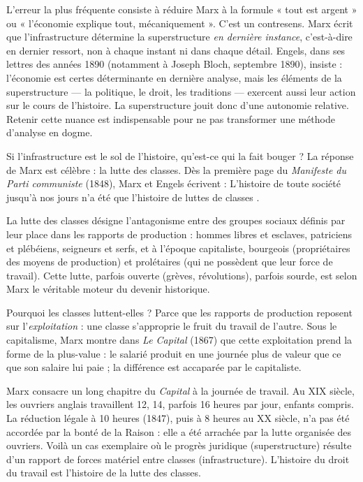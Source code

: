 \documentclass[11pt]{article}
\newcommand{\cle}[1]{{\popxbold\color{popdark}#1}}
\newcounter{popsec}
\newcounter{popsub}
\newcommand{\courssub}[1]{%
  \stepcounter{popsub}%
  \par\vspace{9pt}\noindent{\popxbold\fontsize{11.5}{13}\selectfont\color{popink}{\color{poporange}\thepopsec.\thepopsub}\hspace{6pt}#1}\par\nopagebreak\vspace{4pt}
}
\begin{document}
\begin{attention}
L'erreur la plus fréquente consiste à réduire Marx à la formule « tout est argent » ou « l'économie explique tout, mécaniquement ». C'est un contresens. Marx écrit que l'infrastructure détermine la superstructure \emph{en dernière instance}, c'est-à-dire en dernier ressort, non à chaque instant ni dans chaque détail. Engels, dans ses lettres des années 1890 (notamment à Joseph Bloch, septembre 1890), insiste : l'économie est certes déterminante en dernière analyse, mais les éléments de la superstructure — la politique, le droit, les traditions — exercent aussi leur action sur le cours de l'histoire. La superstructure jouit donc d'une \cle{autonomie relative}. Retenir cette nuance est indispensable pour ne pas transformer une méthode d'analyse en dogme.
\end{attention}

\courssub{Le moteur de l'histoire : la lutte des classes}

Si l'infrastructure est le sol de l'histoire, qu'est-ce qui la fait bouger ? La réponse de Marx est célèbre : la \cle{lutte des classes}. Dès la première page du \emph{Manifeste du Parti communiste} (1848), Marx et Engels écrivent : \guillemotleft L'histoire de toute société jusqu'à nos jours n'a été que l'histoire de luttes de classes \guillemotright.

\begin{definition}
La \cle{lutte des classes} désigne l'antagonisme entre des groupes sociaux définis par leur place dans les rapports de production : hommes libres et esclaves, patriciens et plébéiens, seigneurs et serfs, et à l'époque capitaliste, bourgeois (propriétaires des moyens de production) et prolétaires (qui ne possèdent que leur force de travail). Cette lutte, parfois ouverte (grèves, révolutions), parfois sourde, est selon Marx le véritable moteur du devenir historique.
\end{definition}

Pourquoi les classes luttent-elles ? Parce que les rapports de production reposent sur l'\emph{exploitation} : une classe s'approprie le fruit du travail de l'autre. Sous le capitalisme, Marx montre dans \emph{Le Capital} (1867) que cette exploitation prend la forme de la \cle{plus-value} : le salarié produit en une journée plus de valeur que ce que son salaire lui paie ; la différence est accaparée par le capitaliste.

\begin{exemplebox}
Marx consacre un long chapitre du \emph{Capital} à la journée de travail. Au XIX\ieme{} siècle, les ouvriers anglais travaillent 12, 14, parfois 16 heures par jour, enfants compris. La réduction légale à 10 heures (1847), puis à 8 heures au XX\ieme{} siècle, n'a pas été accordée par la bonté de la Raison : elle a été arrachée par la lutte organisée des ouvriers. Voilà un cas exemplaire où le progrès juridique (superstructure) résulte d'un rapport de forces matériel entre classes (infrastructure). L'histoire du droit du travail est l'histoire de la lutte des classes.
\end{exemplebox}
\end{document}
